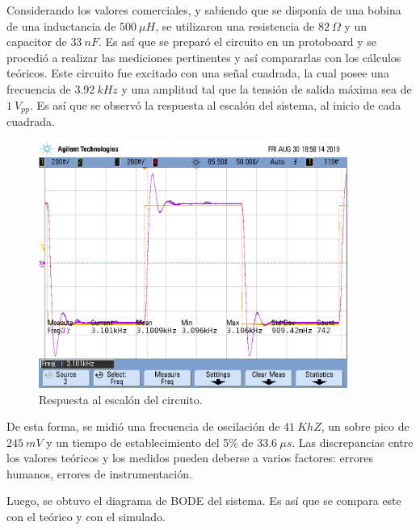 Considerando los valores comerciales, y sabiendo que se disponía de una bobina de una inductancia de $500 \ \mu H$, se utilizaron una resistencia de $82 \ \Omega$ y un capacitor de $33 \ nF$. Es así que se preparó el circuito en un protoboard y se procedió a realizar las mediciones pertinentes y así compararlas con los cálculos teóricos. Este circuito fue excitado con una señal cuadrada, la cual posee una frecuencia de $3.92 \ kHz$ y una amplitud tal que la tensión de salida máxima sea de $1 \ V_{pp}$. Es así que se observó la respuesta al escalón del sistema, al inicio de cada cuadrada.

\begin{figure}[H]
	\centering
	\includegraphics[width=0.9\textwidth, trim = {0 3.4cm 0.4cm 2cm},clip]{Ejercicio2/Mediciones/A/scope_0.png}
\caption{Respuesta al escalón del circuito.}
	\label{fig:rtaescalon}
\end{figure}

De esta forma, se midió una frecuencia de oscilación de $41 \ KhZ $, un sobre pico de $245 \ mV$ y un tiempo de establecimiento del 5\% de $33.6 \ \mu s$. Las discrepancias entre los valores teóricos y los medidos pueden deberse a varios factores: errores humanos, errores de instrumentación.

Luego, se obtuvo el diagrama de BODE del sistema. Es así que se compara este con el teórico y con el simulado.

